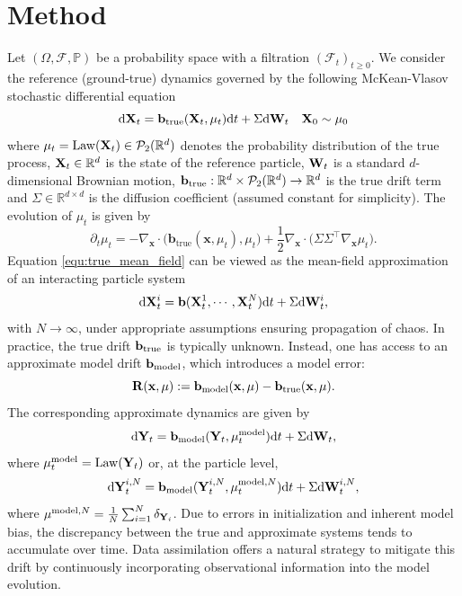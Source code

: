 \section{Method}
Let $(\Omega, \mathcal{F}, \mathbb{P})$ be a probability space with a filtration $(\mathcal{F}_t)_{t \ge 0}$. We consider the reference (ground-true) dynamics governed by the following McKean-Vlasov stochastic differential equation 
\begin{equation}\label{equ:true_mean_field}
\mathrm{d} \mathbf{X}_t  = \mathbf{b}_{\mathrm{true}} (\mathbf{X}_t,\mu_t)\mathrm{d} t + \Sigma\mathrm{d} \mathbf{W}_t \quad \mathbf{X}_0 \sim \mu_0
\end{equation}
where $\mu_t= \mathrm{Law}(\mathbf{X}_t)\in \mathcal P_2(\mathbb R^d)$ denotes the probability distribution of the true process, $\mathbf{X}_t\in \mathbb R^d$ is the state of the reference particle, $\mathbf{W}_t$ is a standard $d$-dimensional Brownian motion, $\mathbf{b}_{\mathrm{true}}:\mathbb R^d\times \mathcal P_2(\mathbb R^d)\to \mathbb R^d$ is the true drift term and $\Sigma  \in \mathbb R^{d\times d}$ is the diffusion coefficient (assumed constant for simplicity). The evolution of $\mu_t$ is given by 
\begin{equation}\label{equ:true_density}
\partial_t \mu_t
= -\nabla_{\mathbf{x}} \cdot \big( \mathbf{b}_{\mathrm{true}}(\mathbf{x},\mu_t),\mu_t \big)+\frac{1}{2}\nabla_{\mathbf{x}} \cdot \big( \Sigma \Sigma^\top \nabla_{\mathbf{x}} \mu_t \big).
\end{equation}
Equation \eqref{equ:true_mean_field} can be viewed as the mean-field approximation of an interacting particle system 
\[
\mathrm{d} \mathbf{X}_t^i  = \mathbf{b}(\mathbf{X}_t^1,\cdots, \mathbf{X}_t^N)\mathrm{d} t  + \Sigma \mathrm{d} \mathbf{W}_t^i,
\]
with $N\to \infty$, under appropriate assumptions ensuring propagation of chaos. In practice, the true drift $\mathbf{b}_{\mathrm{true}}$ is typically unknown. Instead, one has access to an approximate model drift $\mathbf{b}_{\mathrm{model}}$, which introduces a model error:
\[
\mathbf{R}(\mathbf{x},\mu) := \mathbf{b}_{\mathrm{model}}(\mathbf{x},\mu) -  \mathbf{b}_{\mathrm{true}}(\mathbf{x},\mu).
\]
The corresponding approximate dynamics are given by
\[
\mathrm{d} \mathbf{Y}_t = \mathbf{b}_{\mathrm{model}}(\mathbf{Y}_t,\mu^{\mathrm{model}}_t)\mathrm{d} t + \Sigma \mathrm{d} \mathbf{W}_t,
\]
where $\mu^{\mathrm{model}}_t = \mathrm{Law}(\mathbf{Y}_t)$ or, at the particle level,
\begin{equation}
\mathrm{d} \mathbf{Y}^{i,N}_t = \mathbf{b}_{\mathrm{model}}(\mathbf{Y}^{i,N}_t,\mu^{\mathrm{model},N}_t)\mathrm{d} t + \Sigma \mathrm{d} \mathbf{W}^{i,N}_t,
\end{equation}
where $\mu^{\mathrm{model},N} = \frac{1}{N}\sum_{i=1}^N \delta_{\mathbf{Y}_i}$. 
Due to errors in initialization and inherent model bias, the discrepancy between the true and approximate systems tends to accumulate over time. Data assimilation offers a natural strategy to mitigate this drift by continuously incorporating observational information into the model evolution. 

